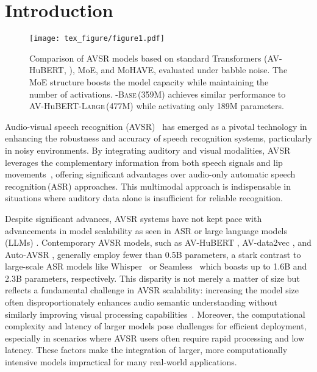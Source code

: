 \section{Introduction}
\label{sec:intro}

\begin{figure}[!t]
    \centering
    \texttt{[image: tex\_figure/figure1.pdf]}
    \vspace{-23pt}
    \caption{Comparison of AVSR models based on standard Transformers (AV-HuBERT, \citealt{shi2022learning}), MoE, and MoHAVE, evaluated under babble noise.
    The MoE structure boosts the model capacity while maintaining the number of activations.
    \ourmodel-\textsc{Base}\,(359M) achieves similar performance to AV-HuBERT-\textsc{Large}\,(477M) while activating only 189M parameters.
    }
    \label{fig:figure1}
    \vspace{-5pt}
\end{figure}

%
Audio-visual speech recognition (AVSR)~\citep{noda2015audio, afouras2018deep, ma2021end, shi2022learning, hsu2022u, hu2023mir} has emerged as a pivotal technology in enhancing the robustness and accuracy of speech recognition systems, particularly in noisy environments. By integrating auditory and visual modalities, AVSR leverages the complementary information from both speech signals and lip movements~\citep{makino2019recurrent, ren2021learning, chen2023leveraging}, offering significant advantages over audio-only automatic speech recognition\,(ASR) approaches. This multimodal approach is indispensable in situations where auditory data alone is insufficient for reliable recognition.

%
Despite significant advances, AVSR systems have not kept pace with advancements in model scalability as seen in ASR \citep{radford2023robust} or large language models (LLMs) \citep{kaplan2020scaling, clark2022unified, achiam2023gpt}. Contemporary AVSR models, such as AV-HuBERT \citep{shi2022learning}, AV-data2vec \citep{lian2023av}, and Auto-AVSR \citep{ma2023auto}, generally employ fewer than 0.5B parameters, a stark contrast to large-scale ASR models like Whisper~\citep{radford2023robust} or Seamless~\citep{barrault2023seamlessm4t} which boasts up to 1.6B and 2.3B parameters, respectively. This disparity is not merely a matter of size but reflects a fundamental challenge in AVSR scalability: increasing the model size often disproportionately enhances audio semantic understanding without similarly improving visual processing capabilities~\citep{dai2024study, kim2024learning}. Moreover, the computational complexity and latency of larger models pose challenges for efficient deployment, especially in scenarios where AVSR users often require rapid processing and low latency. These factors make the integration of larger, more computationally intensive models impractical for many real-world applications.

